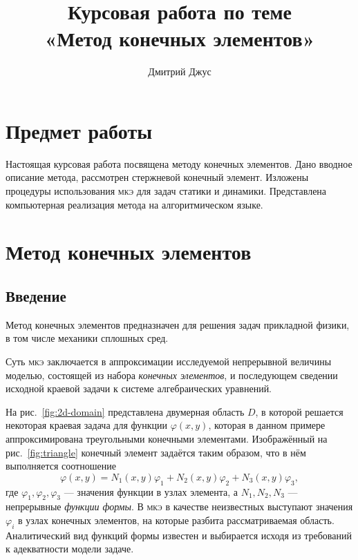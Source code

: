 \documentclass[10pt]{article}
\numberwithin{equation}{section}
\renewcommand{\phi}{\varphi}
\newcommand{\neword}{\emph}
\newcommand{\fem}{\textsc{мкэ}}
\newcommand{\figref}[1]{рис. \ref{#1}}
\begin{document}
\author{Дмитрий Джус}
\title{Курсовая работа по теме \\
  \Huge{«Метод конечных элементов»}}
\pretitle{\begin{center}\LARGE}
  \posttitle{\par\end{center}\vskip 3pc}
\date{}
\maketitle
\thispagestyle{empty}

\clearpage
\tableofcontents

\clearpage
\section*{Предмет работы}

Настоящая курсовая работа посвящена методу конечных элементов. Дано
вводное описание метода, рассмотрен стержневой конечный элемент.
Изложены процедуры использования \fem{} для задач статики и динамики.
Представлена компьютерная реализация метода на алгоритмическом языке.

\clearpage
\section{Метод конечных элементов}

\subsection{Введение}
\label{sec:intro}

Метод конечных элементов предназначен для решения задач
прикладной физики, в том числе механики сплошных сред.

Суть \fem{} заключается в аппроксимации исследуемой непрерывной
величины моделью, состоящей из набора \neword{конечных элементов}, и
последующем сведении исходной краевой задачи к системе алгебраических
уравнений.





На \figref{fig:2d-domain} представлена двумерная область $D$, в
которой решается некоторая краевая задача для функции $\phi(x, y)$,
которая в данном примере аппроксимирована треугольными конечными
элементами. Изображённый на \figref{fig:triangle} конечный элемент
задаётся таким образом, что в нём выполняется соотношение
\begin{equation}
  \label{eq:triangle-shape}
  \phi(x,y) = N_1(x, y) \phi_1 + N_2(x, y) \phi_2 + N_3(x, y) \phi_3,
\end{equation}
где $\phi_1,\phi_2,\phi_3$ — значения функции в узлах элемента, а
$N_1, N_2, N_3$ — непрерывные \neword{функции формы}. В \fem{} в
качестве неизвестных выступают значения $\phi_i$ в узлах конечных
элементов, на которые разбита рассматриваемая область. Аналитический
вид функций формы известен и выбирается исходя из требований к
адекватности модели задаче.
\end{document}
